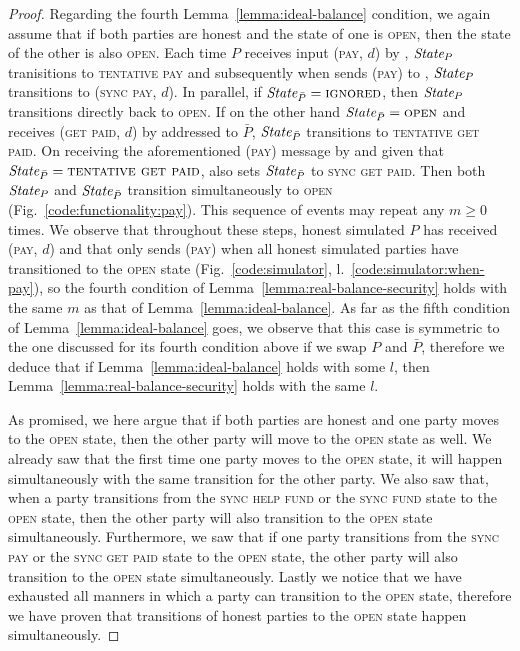 \begin{proof}
  Regarding the fourth Lemma~\ref{lemma:ideal-balance} condition, we again
  assume that if both parties are honest and the state of one is \textsc{open},
  then the state of the other is also \textsc{open}. Each time $P$ receives
  input (\textsc{pay}, $d$) by \environment, $\itistate_P$ tranisitions to
  \textsc{tentative pay} and subsequently when \simulator sends (\textsc{pay})
  to \fchan, $\itistate_P$ transitions to (\textsc{sync pay}, $d$). In parallel,
  if $\itistate_{\bar{P}} = \textsc{ignored}$, then $\itistate_P$ transitions
  directly back to \textsc{open}. If on the other hand $\itistate_{\bar{P}} =
  \textsc{open}$ and \fchan receives (\textsc{get paid}, $d$) by \environment
  addressed to $\bar{P}$, $\itistate_{\bar{P}}$ transitions to \textsc{tentative
  get paid}. On receiving the aforementioned (\textsc{pay}) message by
  \simulator and given that $\itistate_{\bar{P}} = \textsc{tentative get paid}$,
  \fchan also sets $\itistate_{\bar{P}}$ to \textsc{sync get paid}. Then both
  $\itistate_P$ and $\itistate_{\bar{P}}$ transition simultaneously to
  \textsc{open} (Fig.~\ref{code:functionality:pay}). This sequence of events may
  repeat any $m \geq 0$ times. We observe that throughout these steps, honest
  simulated $P$ has received (\textsc{pay}, $d$) and that \simulator only sends
  (\textsc{pay}) when all honest simulated parties have transitioned to the
  \textsc{open} state (Fig.~\ref{code:simulator},
  l.~\ref{code:simulator:when-pay}), so the fourth condition of
  Lemma~\ref{lemma:real-balance-security} holds with the same $m$ as that of
  Lemma~\ref{lemma:ideal-balance}. As far as the fifth condition of
  Lemma~\ref{lemma:ideal-balance} goes, we observe that this case is symmetric
  to the one discussed for its fourth condition above if we swap $P$ and
  $\bar{P}$, therefore we deduce that if Lemma~\ref{lemma:ideal-balance} holds
  with some $l$, then Lemma~\ref{lemma:real-balance-security} holds with the
  same $l$.

  As promised, we here argue that if both parties are honest and one party moves
  to the \textsc{open} state, then the other party will move to the
  \textsc{open} state as well. We already saw that the first time one party
  moves to the \textsc{open} state, it will happen simultaneously with the same
  transition for the other party. We also saw that, when a party transitions
  from the \textsc{sync help fund} or the \textsc{sync fund} state to the
  \textsc{open} state, then the other party will also transition to the
  \textsc{open} state simultaneously. Furthermore, we saw that if one party
  transitions from the \textsc{sync pay} or the \textsc{sync get paid} state to
  the \textsc{open} state, the other party will also transition to the
  \textsc{open} state simultaneously. Lastly we notice that we have exhausted
  all manners in which a party can transition to the \textsc{open} state,
  therefore we have proven that transitions of honest parties to the
  \textsc{open} state happen simultaneously.


\end{proof}

